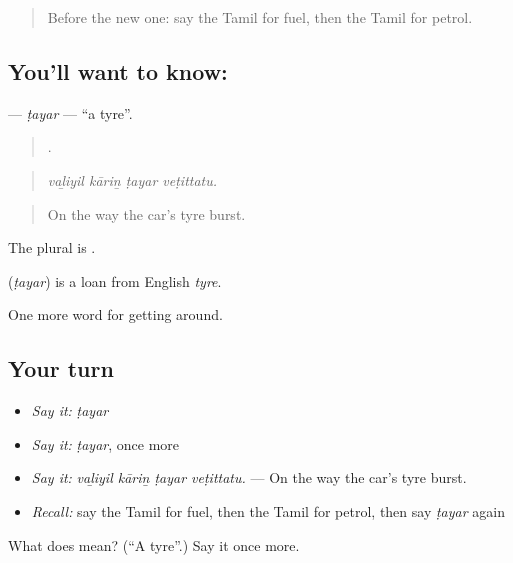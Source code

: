 \begin{quote}
Before the new one: say the Tamil for fuel, then the Tamil for petrol.
\end{quote}

\subsection*{You'll want to know: }
\textbf{} — \emph{ṭayar} — \textquotedblleft{}a tyre\textquotedblright{}.

\begin{quote}
   .
\end{quote}

\begin{quote}
\emph{vaḻiyil kāriṉ ṭayar veṭittatu.}
\end{quote}

\begin{quote}
On the way the car's tyre burst.
\end{quote}

The plural is .

\begin{cousinweb}
\textbf{} (\emph{ṭayar}) is a loan from English \emph{tyre}.
\end{cousinweb}

\begin{grammarlens}[title={What you've built}]
One more word for getting around.
\end{grammarlens}

\subsection*{Your turn}
\begin{itemize}
\raggedright
  \item \emph{Say it:} \emph{ṭayar}
  \item \emph{Say it:} \emph{ṭayar}, once more
  \item \emph{Say it:} \emph{vaḻiyil kāriṉ ṭayar veṭittatu.} — On the way the car's tyre burst.
  \item \emph{Recall:} say the Tamil for fuel, then the Tamil for petrol, then say \emph{ṭayar} again
\end{itemize}

\begin{tcolorbox}[breakable,colback=teal!4,colframe=teal!35!black,title={Before you move on}]
What does  mean? (\textquotedblleft{}A tyre\textquotedblright{}.) Say it once more.
\end{tcolorbox}
